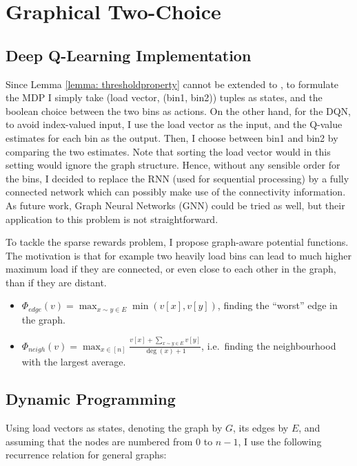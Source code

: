 \section{Graphical Two-Choice}


\subsection{Deep Q-Learning Implementation} \label{graphical-DQN}

Since Lemma \ref{lemma: thresholdproperty} cannot be extended to \GraphicalTwoChoice, to formulate the MDP I simply take (load vector, (bin1, bin2)) tuples as states, and the boolean choice between the two bins as actions. On the other hand, for the DQN, to avoid index-valued input, I use the load vector as the input, and the Q-value estimates for each bin as the output. Then, I choose between bin1 and bin2 by comparing the two estimates. Note that sorting the load vector would in this setting would ignore the graph structure. Hence, without any sensible order for the bins, I decided to replace the RNN (used for sequential processing) by a fully connected network which can possibly make use of the connectivity information. As future work, Graph Neural Networks (GNN) \cite{scarselli2009GNN} could be tried as well, but their application to this problem is not straightforward.



To tackle the sparse rewards problem, I propose graph-aware potential functions. The motivation is that for example two heavily load bins can lead to much higher maximum load if they are connected, or even close to each other in the graph, than if they are distant.


\begin{itemize}
    \item 
    $\Phi_{edge}(v)=\max_{x\sim y \in E} \min(v[x], v[y])$, finding the ``worst'' edge in the graph.
    \item
    $\Phi_{neigh}(v)=\max_{x \in [n]} \frac{v[x]+\sum_{x\sim y \in E}v[y]}{\deg(x)+1}$, i.e.\ finding the neighbourhood with the largest average.
\end{itemize}


\subsection{Dynamic Programming}

Using load vectors as states, denoting the graph by $G$, its edges by $E$, and assuming that the nodes are numbered from $0$ to $n-1$, I use the following recurrence relation for general graphs:


